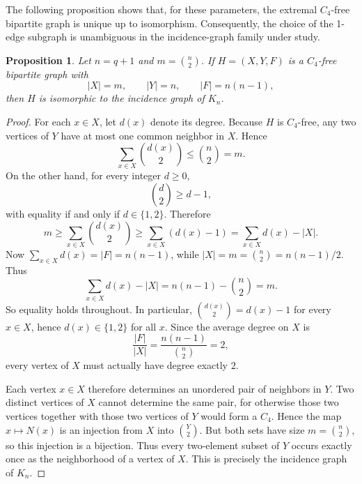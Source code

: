 \documentclass[10pt,a4paper]{amsart}
\newcommand{\blue}[1]{#1}
\newcommand{\0}{\mathbf{0}}
\newcommand{\1}{\mathbf{1}}
\newtheorem{Prop}[Thm]{Proposition}
\begin{document}
\blue{The following proposition shows that, for these parameters, the extremal \(C_4\)-free bipartite graph is unique up to isomorphism. Consequently, the choice of the 1-edge subgraph is unambiguous in the incidence-graph family under study.}


\begin{Prop}
\blue{Let \(n=q+1\) and \(m=\binom{n}{2}\). If \(H=(X,Y,F)\) is a \(C_4\)-free bipartite graph with}
\[
\blue{|X|=m,\qquad |Y|=n,\qquad |F|=n(n-1),}
\]
\blue{then \(H\) is isomorphic to the incidence graph of \(K_n\).}
\end{Prop}

\begin{proof}
\blue{For each \(x\in X\), let \(d(x)\) denote its degree. Because \(H\) is \(C_4\)-free, any two vertices of \(Y\) have at most one common neighbor in \(X\). Hence}
\[
\blue{\sum_{x\in X}\binom{d(x)}{2}\le \binom{n}{2}=m.}
\]
\blue{On the other hand, for every integer \(d\ge 0\),}
\[
\blue{\binom{d}{2}\ge d-1,}
\]
\blue{with equality if and only if \(d\in\{1,2\}\). Therefore}
\[
\blue{m\ge \sum_{x\in X}\binom{d(x)}{2}\ge \sum_{x\in X}(d(x)-1)=\sum_{x\in X}d(x)-|X|.}
\]
\blue{Now \(\sum_{x\in X}d(x)=|F|=n(n-1)\), while \(|X|=m=\binom{n}{2}=n(n-1)/2\). Thus}
\[
\blue{\sum_{x\in X}d(x)-|X|=n(n-1)-\binom{n}{2}=m.}
\]
\blue{So equality holds throughout. In particular, \(\binom{d(x)}{2}=d(x)-1\) for every \(x\in X\), hence \(d(x)\in\{1,2\}\) for all \(x\). Since the average degree on \(X\) is}
\[
\blue{\frac{|F|}{|X|}=\frac{n(n-1)}{\binom{n}{2}}=2,}
\]
\blue{every vertex of \(X\) must actually have degree exactly \(2\).}

\blue{Each vertex \(x\in X\) therefore determines an unordered pair of neighbors in \(Y\). Two distinct vertices of \(X\) cannot determine the same pair, for otherwise those two vertices together with those two vertices of \(Y\) would form a \(C_4\). Hence the map \(x\mapsto N(x)\) is an injection from \(X\) into \(\binom{Y}{2}\). But both sets have size \(m=\binom{n}{2}\), so this injection is a bijection. Thus every two-element subset of \(Y\) occurs exactly once as the neighborhood of a vertex of \(X\). This is precisely the incidence graph of \(K_n\).}
\end{proof}
\end{document}
